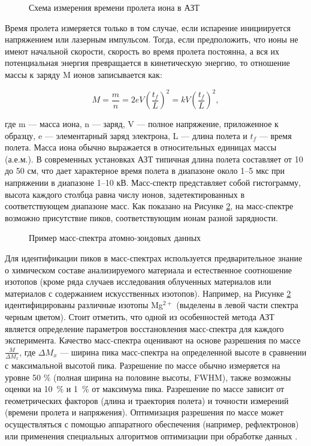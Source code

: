 \begin{figure}[htb]
	\caption{Схема измерения времени пролета иона в АЗТ \cite{Vurpillot16}}
	\label{fig:time_flight}
\end{figure} 

Время пролета измеряется только в том случае, если испарение инициируется напряжением или лазерным импульсом. Тогда, если предположить, что ионы не имеют начальной скорости, скорость во время пролета постоянна, а вся их потенциальная энергия превращается в кинетическую энергию, то отношение массы к заряду M ионов записывается как:

\begin{equation}
	\label{eq:equation8}
	M = \frac{m}{n} = 2eV(\frac{t_f}{L})^2 = kV(\frac{t_f}{L})^2,
\end{equation}

где m — масса иона, n — заряд, V — полное напряжение, приложенное к образцу, e — элементарный заряд электрона, L — длина полета и $t_f$ — время полета. Масса иона обычно выражается в относительных единицах массы (а.е.м.). В современных установках АЗТ типичная длина полета составляет от 10 до 50 см, что дает характерное время полета в диапазоне около 1–5 мкс при напряжении в диапазоне 1–10 кВ.
Масс-спектр представляет собой гистограмму, высота каждого столбца равна числу ионов, задетектированных в соответствующем диапазоне масс. Как показано на Рисунке \cref{fig:mass_spectr}, на масс-спектре возможно присутствие пиков, соответствующим ионам разной зарядности.

\begin{figure}[ht]
	\caption{Пример масс-спектра атомно-зондовых данных \cite{scbibAlumYAFI}}
	\label{fig:mass_spectr}
\end{figure} 

Для идентификации пиков в масс-спектрах используется предварительное знание о химическом составе  анализируемого материала и естественное соотношение изотопов (кроме ряда случаев исследования облученных материалов или материалов с содержанием искусственных изотопов). Например, на Рисунке \cref{fig:mass_spectr} идентифицированы различные изотопы Mg$^{2+}$ (выделены в левой части спектра черным цветом). Стоит отметить, что одной из особенностей метода АЗТ является определение параметров восстановления масс-спектра для каждого эксперимента. Качество масс-спектра оценивают на основе разрешения по массе $\frac{M}{\Delta M_x}$, где $\Delta M_x$ — ширина пика масс-спектра на определенной высоте в сравнении с максимальной высотой пика. Разрешение по массе обычно измеряется на уровне 50 $\%$ (полная ширина на половине высоты, FWHM), также возможны оценки на 10 $\%$ и 1 $\%$ от максимума пика. Разрешение по массе зависит от геометрических факторов (длина и траектория полета) и точности измерений (времени пролета и напряжения). Оптимизация разрешения по массе может осуществляться с помощью аппаратного обеспечения (например, рефлектронов) или применения специальных алгоритмов оптимизации при обработке данных \cite{Shutov19}.

